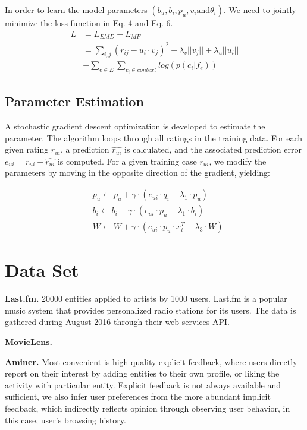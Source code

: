 \documentclass{template}
\begin{document}
In order to learn the model parameters $(b_u,b_i, p_u, v_i \text{and}  \theta_i)$. We need to jointly minimize the loss function in Eq. 4 and Eq. 6.
\begin{equation}
\begin{aligned}
L &= L_{EMD} + L_{MF} \\
&= \sum_{i,j} (r_{ij} - u_i \cdot v_j )^2 + \lambda_v||v_j|| + \lambda_u||u_i|| 
\\ &+ \sum_{e\in E} \sum_{c_i\in context} log(p(c_i|f_e))
\end{aligned}
\end{equation}


\subsection{Parameter Estimation}
A stochastic gradient descent optimization is developed to estimate the parameter. The algorithm loops through all ratings in the training data. For each given rating $r_{ui}$, a prediction $\hat{r_{ui}}$ is calculated, and the associated prediction error $e_{ui} = r_{ui} - \hat{r_{ui}}$ is computed. For a given training case $r_{ui}$, we modify the parameters by moving in the opposite direction of the gradient, yielding:

\begin{equation}
\begin{aligned}
& p_u \leftarrow p_u + \gamma \cdot (e_{ui}\cdot q_i - \lambda_1 \cdot p_u) \\
& b_i \leftarrow b_i + \gamma \cdot (e_{ui}\cdot p_u - \lambda_1 \cdot b_i) \\
& W \leftarrow W + \gamma \cdot (e_{ui}\cdot p_u\cdot x_i^T - \lambda_3 \cdot W)
\end{aligned}
\end{equation}


\section{Data Set}
\textbf{Last.fm.} 20000 entities applied to artists by 1000 users. Last.fm is a popular music system that provides personalized radio stations for its users. The data is gathered during August 2016 through their web services API. 

\textbf{MovieLens.}

\textbf{Aminer.}
Most convenient is high quality explicit feedback, where users directly report on their interest by adding entities to their own profile, or liking the activity with particular entity. Explicit feedback is not always available and sufficient, we also infer user preferences from the more abundant implicit feedback, which indirectly reflects opinion through observing user behavior, in this case, user's browsing history.
\end{document}
